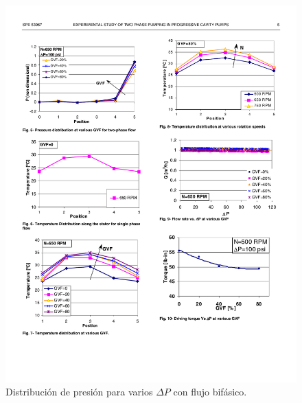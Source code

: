 \begin{figure}

\centering
		
\includegraphics[scale=1,draft=false]{distribucion_presion_bifasico_Martin-1999-426} 


\caption{Distribución de presión para varios $\Delta P$ con flujo bifásico.}

\label{fig:distribucion_presion_bifasico_Martin-1999-426}

\end{figure}


